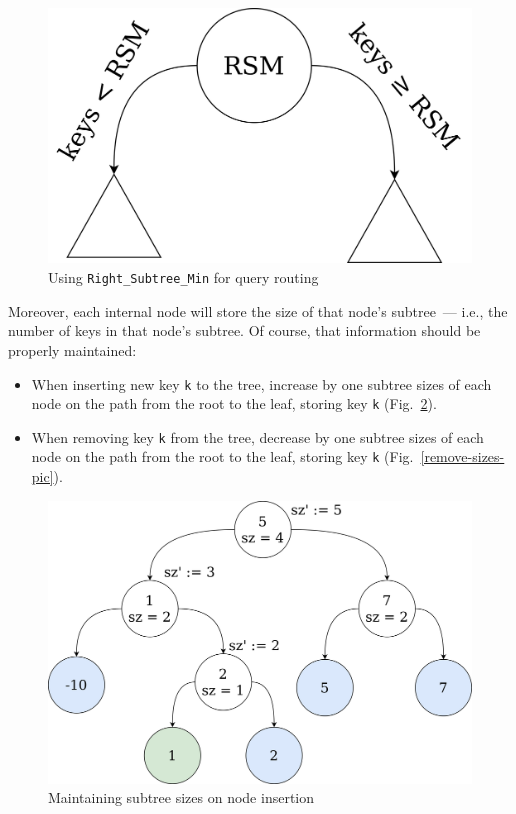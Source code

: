 \documentclass[times, dvipsnames,%
               languages={russian,english} %
              ]{itmo-student-thesis}
\begin{document}
\begin{figure}[H]
  \centering
  \caption{Using \texttt{Right\_Subtree\_Min} for query routing}
  \label{right-subtree-min-pic}
  \includegraphics[width=0.5\linewidth]{pics/right_subtree_min.png}
\end{figure}

Moreover, each internal node will store the size of that node's subtree~--- i.e., the number of keys in that node's subtree. Of course, that information should be properly maintained: 
\begin{itemize}
    \item When inserting new key \texttt{k} to the tree, increase by one subtree sizes of each node on the path from the root to the leaf, storing key \texttt{k} (Fig.~\ref{insert-sizes-pic}).
    
    \item When removing key \texttt{k} from the tree, decrease by one subtree sizes of each node on the path from the root to the leaf, storing key \texttt{k} (Fig.~\ref{remove-sizes-pic}).
\end{itemize}

\begin{figure}[H]
  \centering
  \caption{Maintaining subtree sizes on node insertion}
  \label{insert-sizes-pic}
  \includegraphics[width=\linewidth]{pics/insert-sizes.png}
\end{figure}
\end{document}
